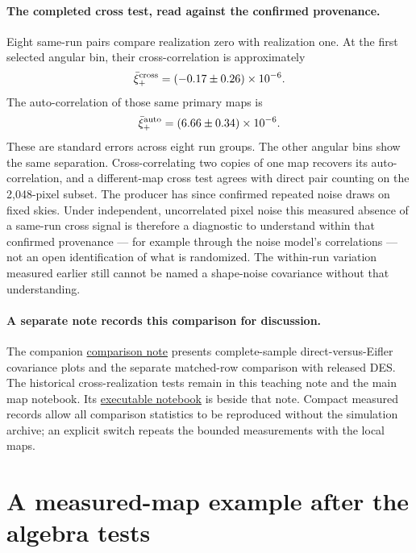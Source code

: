 \documentclass[11pt]{article}
\begin{document}
\paragraph{The completed cross test, read against the confirmed provenance.}
Eight same-run pairs compare realization zero with realization one. At the
first selected angular bin, their cross-correlation is approximately
\begin{equation}
 \bar\xi_+^{\rm cross}=(-0.17\pm0.26)\times10^{-6}.
\end{equation}
The auto-correlation of those same primary maps is
\begin{equation}
 \bar\xi_+^{\rm auto}=(6.66\pm0.34)\times10^{-6}.
\end{equation}
These are standard errors across eight run groups. The other angular bins show the same separation.
Cross-correlating two copies of one map recovers its auto-correlation,
and a different-map cross test agrees with direct pair counting on the
2,048-pixel subset. The producer has since confirmed repeated noise draws
on fixed skies. Under independent, uncorrelated pixel noise this measured
absence of a same-run cross signal is therefore a diagnostic to understand
within that confirmed provenance --- for example through the noise
model's correlations --- not an open identification of what is
randomized. The within-run variation measured earlier still cannot be
named a shape-noise covariance without that understanding.

\paragraph{A separate note records this comparison for discussion.}
The companion \href{../covariance_comparison/covariance_comparison.pdf}
{comparison note} presents complete-sample direct-versus-Eifler covariance
plots and the separate matched-row comparison with released DES. The historical
cross-realization tests remain in this teaching note and the main map notebook. Its
\href{../covariance_comparison/EXAMPLE_COVARIANCE_COMPARISON.ipynb}
{executable notebook} is beside that note. Compact measured records allow
all comparison statistics to be reproduced without the simulation archive;
an explicit switch repeats the bounded measurements with the local maps.

\section{A measured-map example after the algebra tests}
\end{document}
